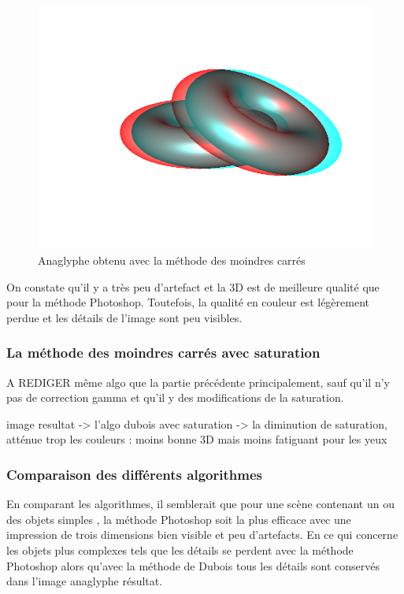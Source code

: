 \begin{figure}[h]
	\centering
	\includegraphics[scale=0.3]{moindreCarres.png}
	\caption{\label{fig:moindresCarres} Anaglyphe obtenu avec la méthode des moindres carrés \protect}
\end{figure}
	
	On constate qu'il y a très peu d'artefact et la 3D est de meilleure qualité que pour la méthode Photoshop. Toutefois, la qualité en couleur est légèrement perdue et les détails de l'image sont peu visibles. 
	

\subsubsection{La méthode des moindres carrés avec saturation}


A REDIGER
même algo que la partie précédente principalement, sauf qu'il n'y pas de correction gamma et qu'il y des modifications de la saturation.

image resultat -> l'algo dubois avec saturation -> la diminution de saturation, atténue trop les couleurs : moins bonne 3D mais moins fatiguant pour les yeux 

\subsubsection{Comparaison des différents algorithmes}

En comparant les algorithmes, il semblerait que pour une scène contenant un ou des objets simples %
, la méthode Photoshop soit la plus efficace avec une impression de trois dimensions bien visible et peu d'artefacts. En ce qui concerne les objets plus complexes tels que %
les détails se perdent avec la méthode Photoshop alors qu'avec la méthode de Dubois tous les détails sont conservés dans l'image anaglyphe résultat. 

